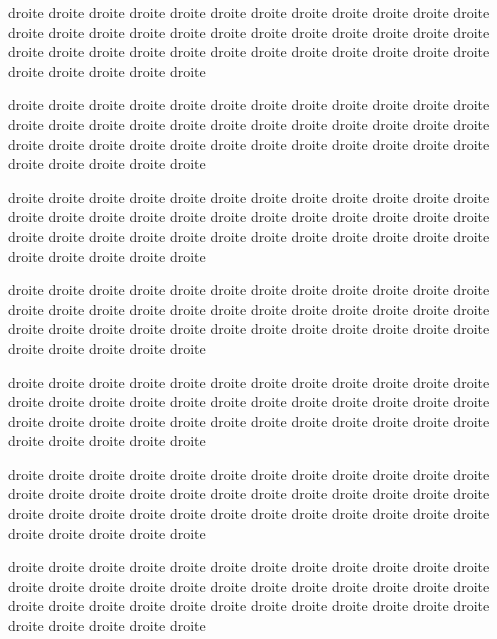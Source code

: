 \documentclass[12pt]{book}
\begin{document}
\begin{pages}
\begin{Rightside}
\pstart
\begin{ledgroup}
droite droite droite droite droite droite droite droite droite droite droite droite droite droite droite droite droite droite droite droite droite droite droite droite droite droite droite droite droite droite droite droite droite droite droite droite droite droite droite droite droite

droite droite droite droite droite droite droite droite droite droite droite droite droite droite droite droite droite droite droite droite droite droite droite droite droite droite droite droite droite droite droite droite droite droite droite droite droite droite droite droite droite
\end{ledgroup}
\pend
\pstart
\begin{ledgroup}
droite droite droite droite droite droite droite droite droite droite droite droite droite droite droite droite droite droite droite droite droite droite droite droite droite droite droite droite droite droite droite droite droite droite droite droite droite droite droite droite droite

droite droite droite droite droite droite droite droite droite droite droite droite droite droite droite droite droite droite droite droite droite droite droite droite droite droite droite droite droite droite droite droite droite droite droite droite droite droite droite droite droite 
\end{ledgroup}
\pend

\pstart
\begin{ledgroup}
droite droite droite droite droite droite droite droite droite droite droite droite droite droite droite droite droite droite droite droite droite droite droite droite droite droite droite droite droite droite droite droite droite droite droite droite droite droite droite droite droite

droite droite droite droite droite droite droite droite droite droite droite droite droite droite droite droite droite droite droite droite droite droite droite droite droite droite droite droite droite droite droite droite droite droite droite droite droite droite droite droite droite

droite droite droite droite droite droite droite droite droite droite droite droite droite droite droite droite droite droite droite droite droite droite droite droite droite droite droite droite droite droite droite droite droite droite droite droite droite droite droite droite droite 
\end{ledgroup}
\pend


\end{Rightside}
\end{pages}
\end{document}
